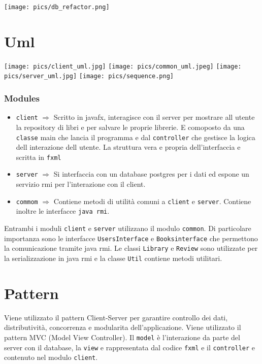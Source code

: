 \documentclass{report}
\begin{document}
\begin{center}
\texttt{[image: pics/db\_refactor.png]} 
\end{center}

\chapter{Uml}
\texttt{[image: pics/client\_uml.jpg]}
\texttt{[image: pics/common\_uml.jpeg]} 
\texttt{[image: pics/server\_uml.jpg]} 
\texttt{[image: pics/sequence.png]} 
\subsection{Modules}

\begin{itemize}
    \item \verb+client+ $ \Rightarrow $ Scritto in javafx, interagisce con il server per mostrare all utente la repository di libri e per salvare le proprie librerie. E comoposto da una \verb+classe+ main che lancia il programma e dal \verb+controller+ che gestisce la logica dell interazione dell utente. La struttura vera e propria dell'interfaccia e scritta in \verb+fxml+
    \item \verb+server+ $ \Rightarrow $ Si interfaccia con un database postgres per i dati ed espone un servizio rmi per l'interazione con il client.
    \item \verb+commom+ $ \Rightarrow $ Contiene metodi di utilità comuni a \verb+client+ e \verb+server+. Contiene inoltre le interfacce \verb+java rmi+.
\end{itemize}
Entrambi i moduli \verb+client+ e \verb+server+ utilizzano il modulo \verb+common+. Di particolare importanza sono le interfacce \verb+UsersInterface+ e \verb+Booksinterface+ che permettono la comunicazione tramite java rmi. Le classi \verb+Library+ e \verb+Review+ sono utilizzate per la serializzazione in java rmi e la classe \verb+Util+ contiene metodi utilitari.

\chapter{Pattern}
Viene utilizzato il pattern Client-Server per garantire controllo dei dati, distributività, concorrenza e modularita dell'applicazione.
Viene utilizzato il pattern MVC (Model View Controller). Il \verb+model+ è l'interazione da parte del server con il database, la \verb+view+ e rappresentata dal codice \verb+fxml+ e il \verb+controller+ e contenuto nel modulo \verb+client+. 
\end{document}
